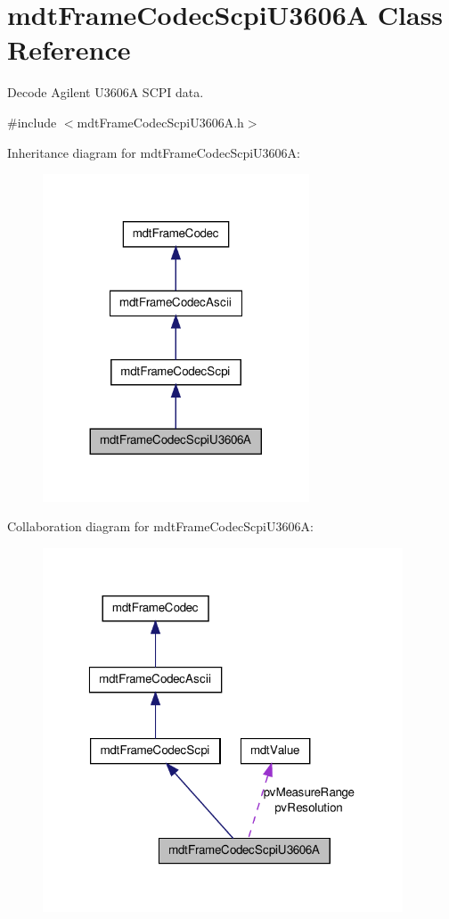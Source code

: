 \hypertarget{classmdt_frame_codec_scpi_u3606_a}{
\section{mdtFrameCodecScpiU3606A Class Reference}
\label{classmdt_frame_codec_scpi_u3606_a}
}


Decode Agilent U3606A SCPI data.  




{\ttfamily \#include $<$mdtFrameCodecScpiU3606A.h$>$}



Inheritance diagram for mdtFrameCodecScpiU3606A:\nopagebreak
\begin{figure}[H]
\begin{center}
\leavevmode
\includegraphics[width=224pt]{classmdt_frame_codec_scpi_u3606_a__inherit__graph}
\end{center}
\end{figure}


Collaboration diagram for mdtFrameCodecScpiU3606A:
\nopagebreak
\begin{figure}[H]
\begin{center}
\leavevmode
\includegraphics[width=303pt]{classmdt_frame_codec_scpi_u3606_a__coll__graph}
\end{center}
\end{figure}
